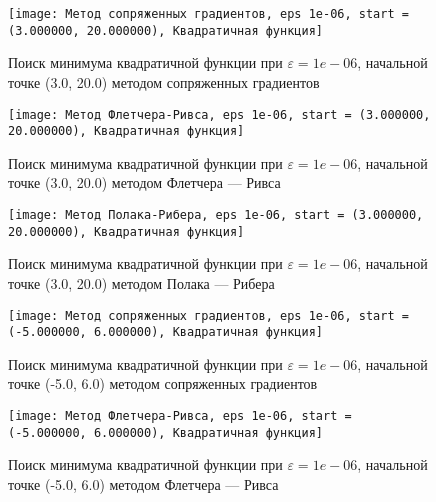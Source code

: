             \begin{figure}[H]
	        \centering
	        \texttt{[image: Метод сопряженных градиентов, eps 1e-06, start = (3.000000, 20.000000), Квадратичная функция]}%
	        \caption{Поиск минимума квадратичной функции при $\varepsilon = 1e-06$, начальной точке (3.0, 20.0) методом сопряженных градиентов}
	        \vspace*{-1.2cm}
            \end{figure}
            
            \begin{figure}[H]
	        \centering
	        \texttt{[image: Метод Флетчера-Ривса, eps 1e-06, start = (3.000000, 20.000000), Квадратичная функция]}%
	        \caption{Поиск минимума квадратичной функции при $\varepsilon = 1e-06$, начальной точке (3.0, 20.0) методом Флетчера --- Ривса}
	        \vspace*{-1.2cm}
            \end{figure}
            
            \begin{figure}[H]
	        \centering
	        \texttt{[image: Метод Полака-Рибера, eps 1e-06, start = (3.000000, 20.000000), Квадратичная функция]}%
	        \caption{Поиск минимума квадратичной функции при $\varepsilon = 1e-06$, начальной точке (3.0, 20.0) методом Полака --- Рибера}
	        \vspace*{-1.2cm}
            \end{figure}
            
            \begin{figure}[H]
	        \centering
	        \texttt{[image: Метод сопряженных градиентов, eps 1e-06, start = (-5.000000, 6.000000), Квадратичная функция]}%
	        \caption{Поиск минимума квадратичной функции при $\varepsilon = 1e-06$, начальной точке (-5.0, 6.0) методом сопряженных градиентов}
	        \vspace*{-1.2cm}
            \end{figure}
            
            \begin{figure}[H]
	        \centering
	        \texttt{[image: Метод Флетчера-Ривса, eps 1e-06, start = (-5.000000, 6.000000), Квадратичная функция]}%
	        \caption{Поиск минимума квадратичной функции при $\varepsilon = 1e-06$, начальной точке (-5.0, 6.0) методом Флетчера --- Ривса}
	        \vspace*{-1.2cm}
            \end{figure}
            
